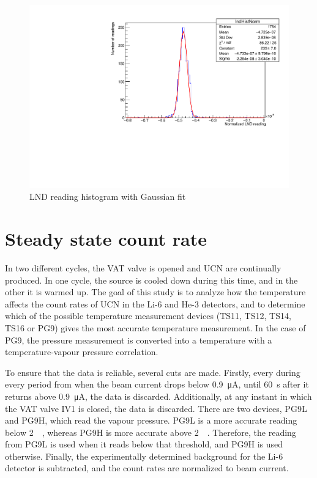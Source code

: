 \documentclass[10pt,letterpaper]{article}
\begin{document}
\begin{figure}
\centering
\includegraphics[width=\textwidth,page=1]{../thermal_neutron_detector/lndHist.pdf}
\caption{LND reading histogram with Gaussian fit}
\label{fig:LNDhist}
\end{figure}



\section{Steady state count rate}

In two different cycles, the VAT valve is opened and UCN are continually produced. In one cycle, the source is cooled down during this time, and in the other it is warmed up. The goal of this study is to analyze how the temperature affects the count rates of UCN in the Li-6 and He-3 detectors, and to determine which of the possible temperature measurement devices (TS11, TS12, TS14, TS16 or PG9) gives the most accurate temperature measurement. In the case of PG9, the pressure measurement is converted into a temperature with a temperature-vapour pressure correlation.

To ensure that the data is reliable, several cuts are made. Firstly, every during every period from when the beam current drops below \SI{0.9}{\micro\ampere}, until \SI{60}{\second} after it returns above \SI{0.9}{\micro\ampere}, the data is discarded. Additionally, at any instant in which the VAT valve IV1 is closed, the data is discarded. There are two devices, PG9L and PG9H, which read the vapour pressure. PG9L is a more accurate reading below \SI{2}{\milli\torr}, whereas PG9H is more accurate above \SI{2}{\milli\torr}. Therefore, the reading from PG9L is used when it reads below that threshold, and PG9H is used otherwise. Finally, the experimentally determined background for the Li-6 detector is subtracted, and the count rates are normalized to beam current.
\end{document}
